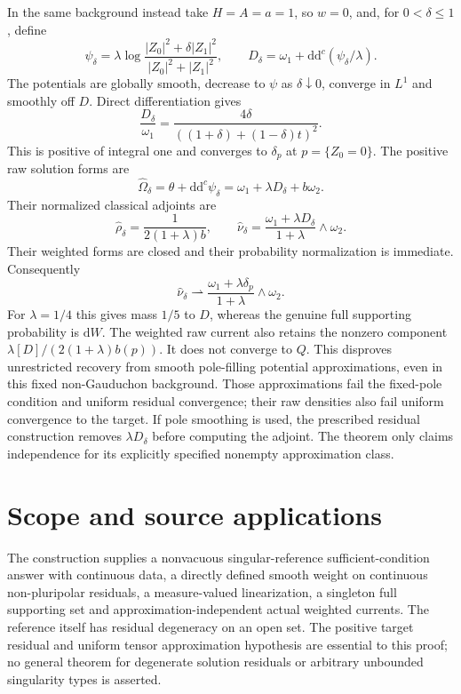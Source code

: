 \documentclass[11pt]{article}
\newcommand{\ddc}{\mathrm{d}\mathrm{d}^c}
\begin{document}
In the same background instead take $H=A=a=1$, so $w=0$, and, for
$0<\delta\le1$, define
\[
 \psi_\delta=\lambda\log
 \frac{|Z_0|^2+\delta|Z_1|^2}{|Z_0|^2+|Z_1|^2},
 \qquad D_\delta=\omega_1+\ddc(\psi_\delta/\lambda).
\]
The potentials are globally smooth, decrease to $\psi$ as $\delta\downarrow0$,
converge in $L^1$ and smoothly off $D$. Direct differentiation gives
\[
 \frac{D_\delta}{\omega_1}
 =\frac{4\delta}{((1+\delta)+(1-\delta)t)^2}.
\]
This is positive of integral one and converges to $\delta_p$ at
$p=\{Z_0=0\}$. The positive raw solution forms are
\[
 \widehat\Omega_\delta=\theta+\ddc\psi_\delta
 =\omega_1+\lambda D_\delta+b\omega_2.
\]
Their normalized classical adjoints are
\[
 \widehat\rho_\delta=\frac1{2(1+\lambda)b},\qquad
 \widehat\nu_\delta
 =\frac{\omega_1+\lambda D_\delta}{1+\lambda}\wedge\omega_2.
\]
Their weighted forms are closed and their probability normalization is
immediate. Consequently
\[
 \widehat\nu_\delta\rightharpoonup
 \frac{\omega_1+\lambda\delta_p}{1+\lambda}\wedge\omega_2.
\]
For $\lambda=1/4$ this gives mass $1/5$ to $D$, whereas the genuine
full supporting probability is $\mathrm{d}W$. The weighted raw current
also retains the nonzero component
$\lambda[D]/(2(1+\lambda)b(p))$. It does not converge to $Q$.
This disproves unrestricted recovery from smooth pole-filling potential
approximations, even in this fixed non-Gauduchon background.
Those approximations fail the fixed-pole condition and uniform residual
convergence; their raw densities also fail uniform convergence to the target.
If pole smoothing is used, the prescribed residual construction removes
$\lambda D_\delta$ before computing the adjoint. The theorem only claims
independence for its explicitly specified nonempty approximation class.

\section{Scope and source applications}

The construction supplies a nonvacuous singular-reference sufficient-condition
answer with continuous data, a directly defined smooth weight on continuous
non-pluripolar residuals, a measure-valued linearization, a singleton full
supporting set and approximation-independent actual weighted currents.
The reference itself has residual degeneracy on an open set. The positive
target residual and uniform tensor approximation hypothesis are essential
to this proof; no general theorem for degenerate solution residuals or
arbitrary unbounded singularity types is asserted.
\end{document}
